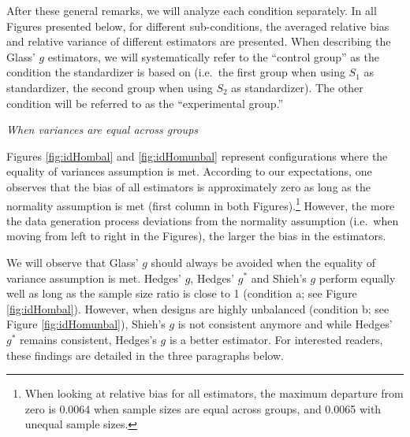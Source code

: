 \documentclass[
  english,
  man,floatsintext]{apa6}
\begin{document}
After these general remarks, we will analyze each condition separately. In all Figures presented below, for different sub-conditions, the averaged relative bias and relative variance of different estimators are presented. When describing the Glass' \(g\) estimators, we will systematically refer to the ``control group'' as the condition the standardizer is based on (i.e.~the first group when using \(S_1\) as standardizer, the second group when using \(S_2\) as standardizer). The other condition will be referred to as the ``experimental group.''

\emph{When variances are equal across groups}

Figures \ref{fig:idHombal} and \ref{fig:idHomunbal} represent configurations where the equality of variances assumption is met. According to our expectations, one observes that the bias of all estimators is approximately zero as long as the normality assumption is met (first column in both Figures).\footnote{When looking at relative bias for all estimators, the maximum departure from zero is 0.0064 when sample sizes are equal across groups, and 0.0065 with unequal sample sizes.} However, the more the data generation process deviations from the normality assumption (i.e.~when moving from left to right in the Figures), the larger the bias in the estimators.

We will observe that Glass' \(g\) should always be avoided when the equality of variance assumption is met. Hedges' \(g\), Hedges' \(g^*\) and Shieh's \(g\) perform equally well as long as the sample size ratio is close to 1 (condition a; see Figure \ref{fig:idHombal}). However, when designs are highly unbalanced (condition b; see Figure \ref{fig:idHomunbal}), Shieh's \(g\) is not consistent anymore and while Hedges' \(g^*\) remains consistent, Hedges's \(g\) is a better estimator. For interested readers, these findings are detailed in the three paragraphs below.
\end{document}
